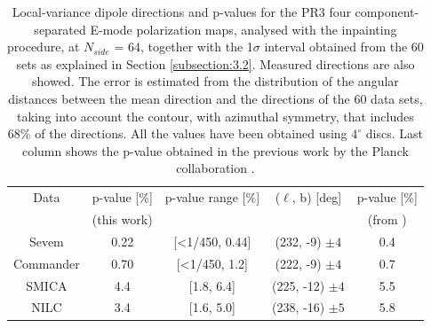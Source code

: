 {\begin{table}[t!]
\centering
\begin{tabular}{ccccc}
\hline
Data      & p-value {[}\%{]} & p-value range {[}\%{]}       & ($\ell$, b) {[}deg{]} & p-value {[}\%{]} \\
& (this work) & & &  (from \cite{Planck:2019evm} )
\\ \hline
Sevem     & 0.22                         & {[}\textless{}1/450, 0.44{]} & (232, -9) $\pm 4$     & 0.4              \\
Commander & 0.70                         & {[}\textless{}1/450, 1.2{]}  & (222, -9) $\pm 4$     & 0.7              \\
SMICA     & 4.4                          & {[}1.8, 6.4{]}               & (225, -12) $\pm 4$    & 5.5              \\
NILC      & 3.4                          & {[}1.6, 5.0{]}               & (238, -16) $\pm 5$    & 5.8              \\ \hline
\end{tabular}
\caption{Local-variance dipole directions and p-values for the PR3 four component-separated E-mode polarization maps, analysed with the inpainting procedure, at $N_{side}$ = 64, together with the 1$\sigma$ interval obtained from the 60 sets as explained in Section \ref{subsection:3.2}. Measured directions are also showed. The error is estimated from the distribution of the angular distances between the mean direction and the directions of the 60 data sets, taking into account the contour, with azimuthal symmetry, that includes 68\% of the directions. All the values have been obtained using $4^{\circ}$ discs. Last column shows the p-value obtained in the previous work by the Planck collaboration \cite{Planck:2019evm}.}
\label{PR3_Results}
\end{table}

}
